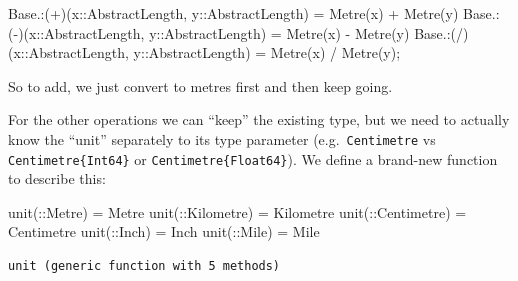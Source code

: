 \documentclass[
]{article}
\newenvironment{Shaded}{\begin{snugshade}}{\end{snugshade}}
\newcommand{\BuiltInTok}[1]{\textcolor[rgb]{0.00,0.23,0.31}{#1}}
\newcommand{\DataTypeTok}[1]{\textcolor[rgb]{0.68,0.00,0.00}{#1}}
\newcommand{\FunctionTok}[1]{\textcolor[rgb]{0.28,0.35,0.67}{#1}}
\newcommand{\NormalTok}[1]{\textcolor[rgb]{0.00,0.23,0.31}{#1}}
\newcommand{\OperatorTok}[1]{\textcolor[rgb]{0.37,0.37,0.37}{#1}}
\begin{document}
\begin{Shaded}
\begin{Highlighting}[]
\BuiltInTok{Base}\NormalTok{.}\OperatorTok{:}\NormalTok{(}\OperatorTok{+}\NormalTok{)(x}\OperatorTok{::}\DataTypeTok{AbstractLength}\NormalTok{, y}\OperatorTok{::}\DataTypeTok{AbstractLength}\NormalTok{) }\OperatorTok{=} \FunctionTok{Metre}\NormalTok{(x) }\OperatorTok{+} \FunctionTok{Metre}\NormalTok{(y)}
\BuiltInTok{Base}\NormalTok{.}\OperatorTok{:}\NormalTok{(}\OperatorTok{{-}}\NormalTok{)(x}\OperatorTok{::}\DataTypeTok{AbstractLength}\NormalTok{, y}\OperatorTok{::}\DataTypeTok{AbstractLength}\NormalTok{) }\OperatorTok{=} \FunctionTok{Metre}\NormalTok{(x) }\OperatorTok{{-}} \FunctionTok{Metre}\NormalTok{(y)}
\BuiltInTok{Base}\NormalTok{.}\OperatorTok{:}\NormalTok{(}\OperatorTok{/}\NormalTok{)(x}\OperatorTok{::}\DataTypeTok{AbstractLength}\NormalTok{, y}\OperatorTok{::}\DataTypeTok{AbstractLength}\NormalTok{) }\OperatorTok{=} \FunctionTok{Metre}\NormalTok{(x) }\OperatorTok{/} \FunctionTok{Metre}\NormalTok{(y);}
\end{Highlighting}
\end{Shaded}

So to add, we just convert to metres first and then keep going.

For the other operations we can ``keep'' the existing type, but we need
to actually know the ``unit'' separately to its type parameter
(e.g.~\texttt{Centimetre} vs \texttt{Centimetre\{Int64\}} or
\texttt{Centimetre\{Float64\}}). We define a brand-new function to
describe this:

\begin{Shaded}
\begin{Highlighting}[]
\FunctionTok{unit}\NormalTok{(}\OperatorTok{::}\DataTypeTok{Metre}\NormalTok{) }\OperatorTok{=}\NormalTok{ Metre}
\FunctionTok{unit}\NormalTok{(}\OperatorTok{::}\DataTypeTok{Kilometre}\NormalTok{) }\OperatorTok{=}\NormalTok{ Kilometre}
\FunctionTok{unit}\NormalTok{(}\OperatorTok{::}\DataTypeTok{Centimetre}\NormalTok{) }\OperatorTok{=}\NormalTok{ Centimetre}
\FunctionTok{unit}\NormalTok{(}\OperatorTok{::}\DataTypeTok{Inch}\NormalTok{) }\OperatorTok{=}\NormalTok{ Inch}
\FunctionTok{unit}\NormalTok{(}\OperatorTok{::}\DataTypeTok{Mile}\NormalTok{) }\OperatorTok{=}\NormalTok{ Mile}
\end{Highlighting}
\end{Shaded}

\begin{verbatim}
unit (generic function with 5 methods)
\end{verbatim}
\end{document}
